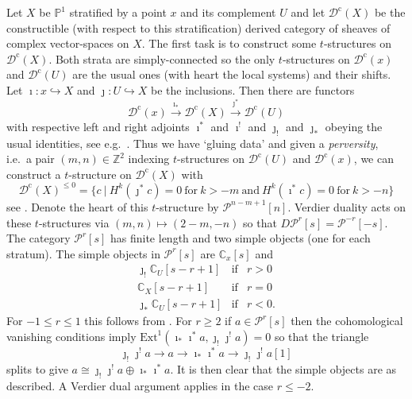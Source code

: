 \documentclass{article}
\theoremstyle{plain}
\theoremstyle{definition}
\theoremstyle{remark}
\newcommand{\defn}[1]{\emph{#1}}
\newcommand{\ie}{i.e.\ }
\newcommand{\eg}{e.g.\ }
\newcommand{\Z}{\mathbb{Z}}
\newcommand{\C}{\mathbb{C}}
\renewcommand{\P}{\mathbb{P}}
\newcommand{\cat}[1]{\mathcal{#1}}
\newcommand{\perv}[3]{\cat{P}^{#1}_{#3}{[#2]}}
\newcommand{\constr}[1]{\cat{D}^\textrm{c}(#1)}
\newcommand{\Ext}[4]{{\mathrm{Ext}_{#1}^{#2}}(#3,#4)}
\begin{document}
Let $X$ be $\P^1$ stratified by a point $x$ and its complement $U$ and let $\constr{X}$ be the constructible (with respect to this stratification) derived category of 
sheaves of complex vector-spaces on
%
 $X$. The first task is to construct some $t$-structures on $\constr{X}$. 
Both strata are simply-connected so the only $t$-structures on $\constr{x}$ and $\constr{U}$ are the usual ones (with heart the local systems) and their shifts. Let $\imath:x \hookrightarrow X$ and $\jmath: U \hookrightarrow X$ be the inclusions. Then there are functors
$$
\constr{x} \stackrel{\imath_*}{\longrightarrow} \constr{X} \stackrel{\jmath^*}{\longrightarrow} \constr{U} 
$$
with respective left and right adjoints $\imath^*$ and $\imath^!$ and $\jmath_!$ and $\jmath_*$ obeying the usual identities, see \eg \cite[\S1.4]{bbd}. Thus we have `gluing data' and given a \defn{perversity}, \ie a pair $(m,n) \in \Z^2$ indexing $t$-structures on $\constr{U}$ and $\constr{x}$, we can construct a $t$-structure on $\constr{X}$ with
$$
\constr{X}^{\leq 0} = \{ c \ | \ H^k(\jmath^*c)=0 \ \textrm{for} \ k>-m \ \textrm{and}\  H^k(\imath^*c)=0 \ \textrm{for} \ k>-n \}
$$
see \cite[\S1.4.9]{bbd}. Denote the heart of this $t$-structure by $\perv{n-m+1}{n}{}$. Verdier duality acts on these $t$-structures via $(m,n) \mapsto (2-m,-n)$ so that $D\perv{r}{s}{} = \perv{-r}{-s}{}$.  The category $\perv{r}{s}{}$ has finite length and two simple objects (one for each stratum). The simple objects in $\perv{r}{s}{}$ are $\C_x[s]$ and
\begin{eqnarray*}
\jmath_!\C_U[s-r+1] & \textrm{if} &  r>0\\
\C_X[s-r+1]& \textrm{if} & r=0 \\
\jmath_*\C_U[s-r+1]& \textrm{if} & r<0.
\end{eqnarray*}
For $-1 \leq r \leq 1$ this follows from \cite[Chapter 7, Proposition 1.10.1]{gema}. For $r\geq 2$ if $a\in \perv{r}{s}{}$ then the cohomological vanishing conditions imply $\Ext{}{1}{\imath_*\imath^*a}{\jmath_!\jmath^!a}=0$ so that the triangle
$$
\jmath_!\jmath^!a \to a \to \imath_*\imath^*a\to \jmath_!\jmath^!a[1]
$$
splits to give $a \cong \jmath_!\jmath^!a \oplus \imath_*\imath^*a$. It is then clear that the simple objects are as described. A Verdier dual argument applies in the case $r\leq -2$.
\end{document}
